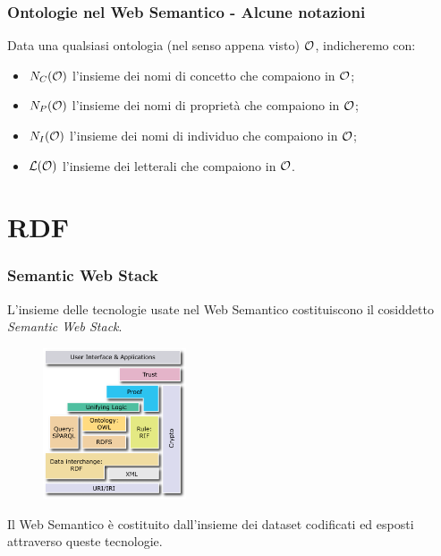 \documentclass[8pt]{beamer}
\begin{document}
\begin{frame}
\frametitle{Ontologie nel Web Semantico - Alcune notazioni}
Data una qualsiasi ontologia (nel senso appena visto) $\mathcal{O}$, indicheremo con:
\begin{itemize}
 \item $N_C(\mathcal{O})$ l'insieme dei nomi di concetto che compaiono in $\mathcal{O}$;
 \item $N_P(\mathcal{O})$ l'insieme dei nomi di propriet\`a che compaiono in $\mathcal{O}$;
 \item $N_I(\mathcal{O})$ l'insieme dei nomi di individuo che compaiono in $\mathcal{O}$;
 \item $\mathcal{L}(\mathcal{O})$ l'insieme dei letterali che compaiono in $\mathcal{O}$.
\end{itemize}

\end{frame}

\section{RDF}

\begin{frame}
 \frametitle{Semantic Web Stack}
 
 L'insieme delle tecnologie usate nel Web Semantico costituiscono il 
 cosiddetto \emph{Semantic Web Stack}.
 
 \begin{figure}
   \includegraphics[width=160px]{Semantic_Web_Stack.png} 
 \end{figure}

 Il Web Semantico \`e costituito dall'insieme dei dataset 
 codificati ed esposti attraverso queste tecnologie.
\end{frame}
\end{document}
